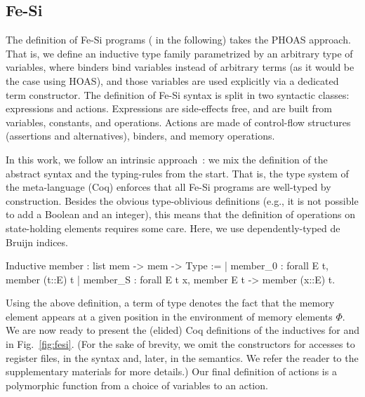 \documentclass[preprint]{sigplanconf}
\begin{document}
\subsection{Fe-Si}
The definition of Fe-Si programs ( in the following)
takes the PHOAS approach. 
%
That is, we define an inductive type family parametrized by an
arbitrary type  of variables, where binders bind variables
instead of arbitrary terms (as it would be the case using HOAS), and
those variables are used explicitly via a dedicated term constructor.
%
The definition of Fe-Si syntax is split in two syntactic classes:
expressions and actions. 
%
Expressions are side-effects free, and are built from variables,
constants, and operations.
%
Actions are made of control-flow structures (assertions and
alternatives), binders, and memory operations. 

In this work, we follow an intrinsic
approach~\cite{DBLP:journals/jar/BentonHKM12}: we mix the definition
of the abstract syntax and the typing-rules from the start. That is,
the type system of the meta-language (Coq) enforces that all Fe-Si
programs are well-typed by construction.
%
Besides the obvious type-oblivious definitions (e.g., it is not
possible to add a Boolean and an integer), this means that the
definition of operations on state-holding elements requires some care.
%
Here, we use dependently-typed de Bruijn indices. 
\begin{coq}
Inductive member : list mem -> mem ->  Type :=
| member_0 : forall E t, member (t::E) t
| member_S : forall E t x, member E t -> member (x::E) t.
\end{coq}
Using the above definition, a term of type  denotes
the fact that the memory element  appears at a given position
in the environment of memory elements $\Phi$. 
%
We are now ready to present the (elided) Coq definitions of the
inductives for  and  in Fig.~\ref{fig:fesi}.
%
(For the sake of brevity, we omit the constructors for accesses to
register files, in the syntax and, later, in the semantics. We refer
the reader to the supplementary materials for more details.)
%
Our final definition  of actions is a polymorphic
function from a choice of variables to an action.
\end{document}
